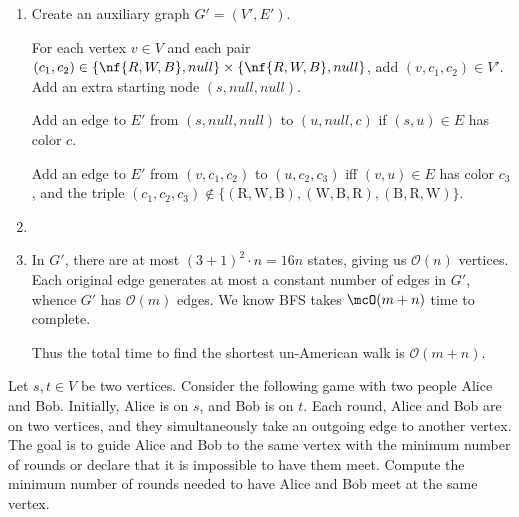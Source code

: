 \documentclass{article}
\begin{document}
\begin{solution}

\begin{enumerate}[label=(\alph*)]
  \item Create an auxiliary graph \( G' = (V', E') \).

  For each vertex \( v \in V \) and each pair \( (c_1, c_2) \in \{\nf{R,W,B}, null\}\times \{\nf{R,W,B}, null\} \), add \( (v, c_1, c_2) \in V' \).
  Add an extra starting node \( (s, null, null) \).

  Add an edge to \( E' \) from \( (s, null, null) \) to \( (u, null, c) \) if \( (s,u)\in E \) has color \( c \).

  Add an edge to \( E' \) from  \( (v, c_1, c_2) \) to \( (u, c_2, c_3) \) iff \( (v,u)\in E \) has color \( c_3 \), and the triple \( (c_1, c_2, c_3)\not\in \{ (\mathrm{R},\mathrm{W},\mathrm{B}), (\mathrm{W},\mathrm{B},\mathrm{R}), (\mathrm{B},\mathrm{R},\mathrm{W}) \}. \)

  \item {}

  \item In \( G' \), there are at most \( (3 + 1)^2 \cdot n = 16n \) states, giving us \( \mathcal{O}(n) \) vertices.
  Each original edge generates at most a constant number of edges in \( G' \), whence \( G' \) has \( \mathcal{O}(m) \) edges.
  We know BFS takes \( \mcO(m+n) \) time to complete.

  Thus the total time to find the shortest un-American walk is \( \mathcal{O}(m + n) \).
\end{enumerate}
\end{solution}
\pagebreak

\begin{subexercise} %
  Let \( s,t\in V \) be two vertices.
  Consider the following game with two people Alice and Bob.
  Initially, Alice is on \( s \), and Bob is on \( t \).
  Each round, Alice and Bob are on two vertices, and they simultaneously take an outgoing edge to another vertex.
  The goal is to guide Alice and Bob to the same vertex with the minimum number of rounds or declare that it is impossible to have them meet.
  Compute the minimum number of rounds needed to have Alice and Bob meet at the same vertex.
\end{subexercise}
\end{document}
